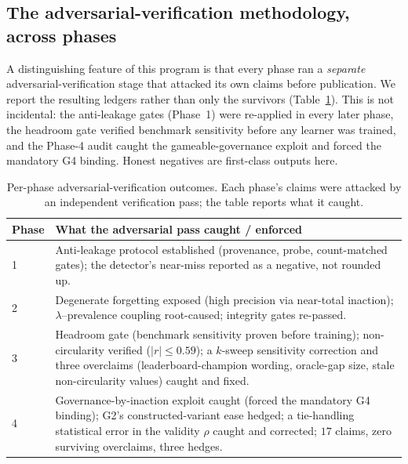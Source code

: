 \documentclass[11pt]{article}
\begin{document}
\subsection{The adversarial-verification methodology, across phases}
A distinguishing feature of this program is that every phase ran a \emph{separate}
adversarial-verification stage that attacked its own claims before publication. We
report the resulting ledgers rather than only the survivors (Table~\ref{tab:adv}).
This is not incidental: the anti-leakage gates (Phase~1) were re-applied in every
later phase, the headroom gate verified benchmark sensitivity before any learner was
trained, and the Phase-4 audit caught the gameable-governance exploit and forced the
mandatory G4 binding. Honest negatives are first-class outputs here.

\begin{table}[h]\centering\small
\caption{Per-phase adversarial-verification outcomes. Each phase's claims were
attacked by an independent verification pass; the table reports what it caught.}
\label{tab:adv}
\begin{tabular}{p{1.0cm}p{11.5cm}}
\toprule
Phase & What the adversarial pass caught / enforced \\
\midrule
1 & Anti-leakage protocol established (provenance, probe, count-matched gates); the
detector's near-miss reported as a negative, not rounded up. \\
2 & Degenerate forgetting exposed (high precision via near-total inaction);
$\lambda$--prevalence coupling root-caused; integrity gates re-passed. \\
3 & Headroom gate (benchmark sensitivity proven before training); non-circularity
verified ($|r|\le 0.59$); a $k$-sweep sensitivity correction and three overclaims
(leaderboard-champion wording, oracle-gap size, stale non-circularity values) caught
and fixed. \\
4 & Governance-by-inaction exploit caught (forced the mandatory G4 binding);
G2's constructed-variant ease hedged; a tie-handling statistical error in the validity
$\rho$ caught and corrected; $17$ claims, zero surviving overclaims, three hedges. \\
\bottomrule
\end{tabular}
\end{table}
\end{document}
